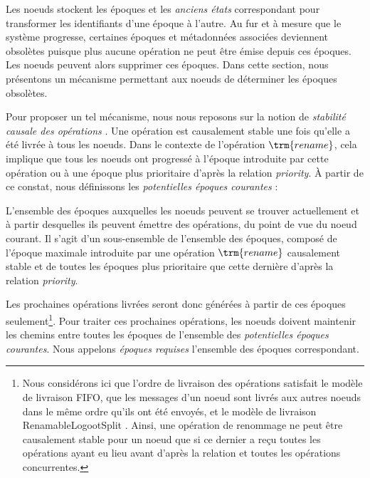 \label{sec:gc-mechanism}

Les noeuds stockent les époques et les \emph{anciens états} correspondant pour transformer les identifiants d'une époque à l'autre.
Au fur et à mesure que le système progresse, certaines époques et métadonnées associées deviennent obsolètes puisque plus aucune opération ne peut être émise depuis ces époques.
Les noeuds peuvent alors supprimer ces époques.
Dans cette section, nous présentons un mécanisme permettant aux noeuds de déterminer les époques obsolètes.

Pour proposer un tel mécanisme, nous nous reposons sur la notion de \emph{stabilité causale des opérations} \cite{10.1007/978-3-662-43352-2_11}.
Une opération est causalement stable une fois qu'elle a été livrée à tous les noeuds.
Dans le contexte de l'opération $\trm{rename}$, cela implique que tous les noeuds ont progressé à l'époque introduite par cette opération ou à une époque plus prioritaire d'après la relation \emph{priority}.
À partir de ce constat, nous définissons les \emph{potentielles époques courantes} :

\begin{definition}
  L'ensemble des époques auxquelles les noeuds peuvent se trouver actuellement et à partir desquelles ils peuvent émettre des opérations, du point de vue du noeud courant.
  Il s'agit d'un sous-ensemble de l'ensemble des époques, composé de l'époque maximale introduite par une opération $\trm{rename}$ causalement stable et de toutes les époques plus prioritaire que cette dernière d'après la relation \emph{priority}.
\end{definition}

Les prochaines opérations livrées seront donc générées à partir de ces époques seulement\footnote{
    Nous considérons ici que l'ordre de livraison des opérations satisfait le modèle de livraison FIFO, \ie que les messages d'un noeud sont livrés aux autres noeuds dans le même ordre qu'ils ont été envoyés, et le modèle de livraison RenamableLogootSplit .
    Ainsi, une opération de renommage ne peut être causalement stable pour un noeud que si ce dernier a reçu toutes les opérations ayant eu lieu avant d'après la relation \hb et toutes les opérations concurrentes.
}.
Pour traiter ces prochaines opérations, les noeuds doivent maintenir les chemins entre toutes les époques de l'ensemble des \emph{potentielles époques courantes}.
Nous appelons \emph{époques requises} l'ensemble des époques correspondant.

